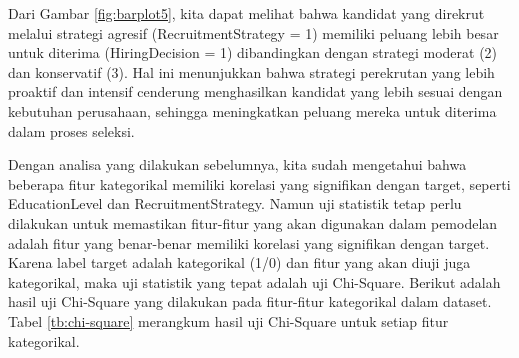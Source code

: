 Dari Gambar \ref{fig:barplot5}, kita dapat melihat bahwa kandidat yang direkrut melalui strategi agresif (RecruitmentStrategy = 1) memiliki peluang lebih besar untuk diterima (HiringDecision = 1) dibandingkan dengan strategi moderat (2) dan konservatif (3). Hal ini menunjukkan bahwa strategi perekrutan yang lebih proaktif dan intensif cenderung menghasilkan kandidat yang lebih sesuai dengan kebutuhan perusahaan, sehingga meningkatkan peluang mereka untuk diterima dalam proses seleksi.

Dengan analisa yang dilakukan sebelumnya, kita sudah mengetahui bahwa beberapa fitur kategorikal memiliki korelasi yang signifikan dengan target, seperti EducationLevel dan RecruitmentStrategy. Namun uji statistik tetap perlu dilakukan untuk memastikan fitur-fitur yang akan digunakan dalam pemodelan adalah fitur yang benar-benar memiliki korelasi yang signifikan dengan target. Karena label target adalah kategorikal (1/0) dan fitur yang akan diuji juga kategorikal, maka uji statistik yang tepat adalah uji Chi-Square. Berikut adalah hasil uji Chi-Square yang dilakukan pada fitur-fitur kategorikal dalam dataset. Tabel \ref{tb:chi-square} merangkum hasil uji Chi-Square untuk setiap fitur kategorikal.



